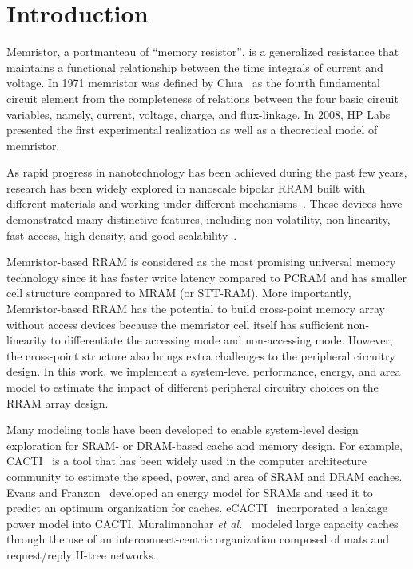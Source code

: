 \section{Introduction} \label{sec:intro}

Memristor, a portmanteau of ``memory resistor'', is a generalized resistance that maintains a functional relationship between the time integrals of current and voltage.  In 1971 memristor was defined by Chua~\cite{memristor:chua} as the fourth fundamental circuit element from the completeness of relations between the four basic circuit variables, namely, current, voltage, charge, and flux-linkage.  In 2008, HP Labs~\cite{memristor:missing} presented the first experimental realization as well as a theoretical model of memristor.
\begin{comment}
Comment Template
\end{comment}
As rapid progress in nanotechnology has been achieved during the past few years, research has been widely explored in nanoscale bipolar RRAM built with different materials and working under different mechanisms~\cite{rram:hfo2,rram:al2o3}. These devices have demonstrated many distinctive features, including non-volatility, non-linearity, fast access, high density, and good scalability~\cite{memristor:how}.

Memristor-based RRAM is considered as the most promising universal memory technology since it has faster write latency compared to PCRAM and has smaller cell structure compared to MRAM (or STT-RAM).  More importantly, Memristor-based RRAM has the potential to build cross-point memory array without access devices because the memristor cell itself has sufficient non-linearity to differentiate the accessing mode and non-accessing mode.  However, the cross-point structure also brings extra challenges to the peripheral circuitry design.  In this work, we implement a system-level performance, energy, and area model to estimate the impact of different peripheral circuitry choices on the RRAM array design.

Many modeling tools have been developed to enable system-level design exploration for SRAM- or DRAM-based cache and memory design.  For example, CACTI~\cite{CACTI51} is a tool that has been widely used in the computer architecture community to estimate the speed, power, and area of SRAM and DRAM caches.  Evans and Franzon~\cite{CACTI:JSSC95:Evans} developed an energy model for SRAMs and used it to predict an optimum organization for caches.  eCACTI~\cite{eCACTI} incorporated a leakage power model into CACTI.  Muralimanohar \emph{et al.}~\cite{CACTI60} modeled large capacity caches through the use of an interconnect-centric organization composed of mats and request/reply H-tree networks.

